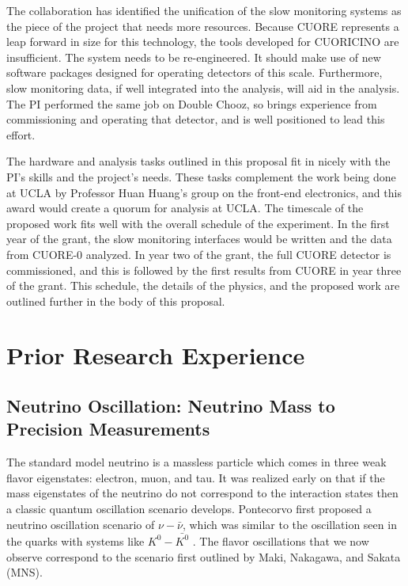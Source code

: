 The collaboration has identified the unification of the slow monitoring systems as the piece of the project that needs more resources. Because CUORE represents a leap forward in size for this technology, the tools developed for CUORICINO are insufficient. The system needs to be re-engineered. It should make use of new software packages designed for operating detectors of this scale. Furthermore, slow monitoring data, if well integrated into the analysis, will aid in the analysis. The PI performed the same job on Double Chooz, so brings experience from commissioning and operating that detector, and is well positioned to lead this effort.    

The hardware and analysis tasks outlined in this proposal fit in nicely with the PI's skills and the project's needs. These tasks complement the work being done at UCLA  by Professor Huan Huang's group on the front-end electronics, and this award would create a quorum for analysis at UCLA. The timescale of the proposed work fits well with the overall schedule of the experiment. In the first year of the grant, the slow monitoring interfaces would be written and the data from CUORE-0 analyzed. In year two of the grant, the full CUORE detector is commissioned, and this is followed by the first results from CUORE in year three of the grant. This schedule, the details of the physics, and the proposed work are outlined further in the body of this proposal.


\section{Prior Research Experience}
\subsection{Neutrino Oscillation: Neutrino Mass to Precision Measurements}
The standard model neutrino is a massless particle which comes in three weak flavor eigenstates: electron, muon, and tau. It was realized early on that if the mass eigenstates of the neutrino do not correspond to the interaction states then a classic quantum oscillation scenario develops. Pontecorvo first proposed a neutrino oscillation scenario of  $\nu-\bar{\nu}$, which was similar to the oscillation seen in the quarks with systems like $K^{0}-\bar{K^{0}}$ \cite{Pontecorvo:1957qd}. The flavor oscillations that we now observe correspond to the scenario first outlined by Maki, Nakagawa, and Sakata (MNS)\cite{Maki:1962mu}. 


